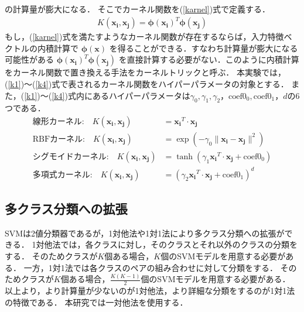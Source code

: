 の計算量が膨大になる．
そこでカーネル関数を(\ref{karnel})式で定義する．
\begin{align}
    \label{karnel}
  K( \boldsymbol{x_i}, \boldsymbol{x_j}) = \boldsymbol{\phi}(\boldsymbol{x_i})^T \boldsymbol{\phi}(\boldsymbol{x_j})
\end{align}
もし，(\ref{karnel})式を満たすようなカーネル関数が存在するならば，入力特徴ベクトルの内積計算で
$\boldsymbol{\phi}(\boldsymbol{x})$
を得ることができる．すなわち計算量が膨大になる可能性がある
$\boldsymbol{\phi}(\boldsymbol{x_i})^T \boldsymbol{\phi}(\boldsymbol{x_j})$
を直接計算する必要がない．このように内積計算をカーネル関数で置き換える手法をカーネルトリックと呼ぶ．
本実験では，(\ref{k1})〜(\ref{k4})式で表されるカーネル関数をハイパーパラメータの対象とする．
また，(\ref{k1})〜(\ref{k4})式内にあるハイパーパラメータは$\gamma_0,\gamma_1,\gamma_2，\text{coef0}_0,\text{coef0}_1，d$の6つである．
\begin{align}
    \text{線形カーネル:} \quad K(\boldsymbol{x_i}, \boldsymbol{x_j}) &= \boldsymbol{x_i}^T \cdot \boldsymbol{x_j}\label{k1} \\
    \text{RBFカーネル:} \quad K(\boldsymbol{x_i}, \boldsymbol{x_j}) &= \exp\left(-\gamma_0 \| \boldsymbol{x_i} - \boldsymbol{x_j} \|^2\right)\label{k2} \\
    \text{シグモイドカーネル:} \quad K(\boldsymbol{x_i}, \boldsymbol{x_j}) &= \tanh(\gamma_1 \boldsymbol{x_i}^T \cdot \boldsymbol{x_j} + \text{coef0}_0) \label{k3}\\
    \text{多項式カーネル:} \quad K(\boldsymbol{x_i}, \boldsymbol{x_j}) &= (\gamma_2\boldsymbol{x_i}^T \cdot \boldsymbol{x_j} + \text{coef0}_1)^d\label{k4}
\end{align}
\subsection{多クラス分類への拡張}
SVMは2値分類器であるが，1対他法や1対1法により多クラス分類への拡張ができる．
1対他法では，各クラスに対し，そのクラスとそれ以外のクラスの分類をする．
そのためクラスが$K$個ある場合，$K$個のSVMモデルを用意する必要がある．
一方，1対1法では各クラスのペアの組み合わせに対して分類をする．
そのためクラスが$K$個ある場合，$\frac{K(K-1)}{2}$個のSVMモデルを用意する必要がある．
以上より，より計算量が少ないのが1対他法，より詳細な分類をするのが1対1法の特徴である．
本研究では一対他法を使用する．

